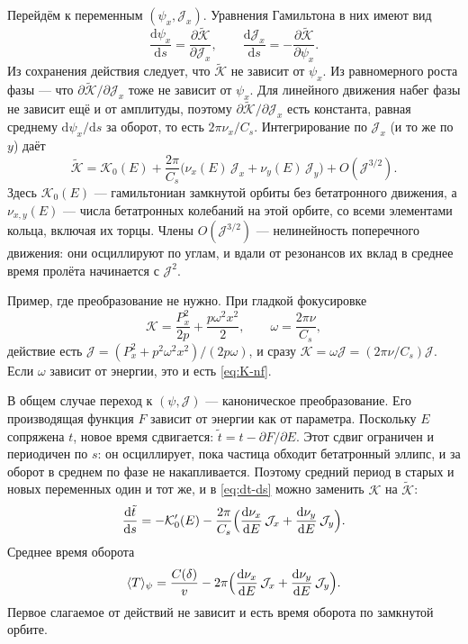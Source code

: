 Перейдём к переменным $(\psi_x,\mathcal{J}_x)$. Уравнения Гамильтона в них имеют вид
\begin{equation*}
\frac{\mathrm{d}\psi_x}{\mathrm{d}s}=\frac{\partial\tilde{\mathcal{K}}}{\partial\mathcal{J}_x},
\qquad
\frac{\mathrm{d}\mathcal{J}_x}{\mathrm{d}s}=-\frac{\partial\tilde{\mathcal{K}}}{\partial\psi_x}.
\end{equation*}
Из сохранения действия следует, что $\tilde{\mathcal{K}}$ не зависит от $\psi_x$. Из равномерного роста фазы --- что $\partial\tilde{\mathcal{K}}/\partial\mathcal{J}_x$ тоже не зависит от $\psi_x$. Для линейного движения набег фазы не зависит ещё и от амплитуды, поэтому $\partial\tilde{\mathcal{K}}/\partial\mathcal{J}_x$ есть константа, равная среднему $\mathrm{d}\psi_x/\mathrm{d}s$ за оборот, то есть $2\pi\nu_x/C_s$. Интегрирование по $\mathcal{J}_x$ (и то же по $y$) даёт
\begin{equation}
\label{eq:K-nf}
\tilde{\mathcal{K}}=\mathcal{K}_0(E)+\frac{2\pi}{C_s}\bigl(\nu_x(E)\,\mathcal{J}_x+\nu_y(E)\,\mathcal{J}_y\bigr)+O(\mathcal{J}^{3/2}).
\end{equation}
Здесь $\mathcal{K}_0(E)$ --- гамильтониан замкнутой орбиты без бетатронного движения, а $\nu_{x,y}(E)$ --- числа бетатронных колебаний на этой орбите, со всеми элементами кольца, включая их торцы. Члены $O(\mathcal{J}^{3/2})$ --- нелинейность поперечного движения: они осциллируют по углам, и вдали от резонансов их вклад в среднее время пролёта начинается с $\mathcal{J}^2$.

Пример, где преобразование не нужно. При гладкой фокусировке
\begin{equation*}
\mathcal{K}=\frac{P_x^2}{2p}+\frac{p\omega^2 x^2}{2},
\qquad
\omega=\frac{2\pi\nu}{C_s},
\end{equation*}
действие есть $\mathcal{J}=(P_x^2+p^2\omega^2 x^2)/(2p\omega)$, и сразу $\mathcal{K}=\omega\mathcal{J}=(2\pi\nu/C_s)\mathcal{J}$. Если $\omega$ зависит от энергии, это и есть \eqref{eq:K-nf}.

В общем случае переход к $(\psi,\mathcal{J})$ --- каноническое преобразование. Его производящая функция $F$ зависит от энергии как от параметра. Поскольку $E$ сопряжена $t$, новое время сдвигается: $\tilde t=t-\partial F/\partial E$. Этот сдвиг ограничен и периодичен по $s$: он осциллирует, пока частица обходит бетатронный эллипс, и за оборот в среднем по фазе не накапливается. Поэтому средний период в старых и новых переменных один и тот же, и в \eqref{eq:dt-ds} можно заменить $\mathcal{K}$ на $\tilde{\mathcal{K}}$:
\begin{equation}
\label{eq:dt-nf}
\frac{\mathrm{d}\tilde t}{\mathrm{d}s}
=-\mathcal{K}_0'(E)
-\frac{2\pi}{C_s}\Bigl(\frac{\mathrm{d}\nu_x}{\mathrm{d}E}\,\mathcal{J}_x+\frac{\mathrm{d}\nu_y}{\mathrm{d}E}\,\mathcal{J}_y\Bigr).
\end{equation}
Среднее время оборота
\begin{equation*}
\langle T\rangle_\psi
=\frac{C(\delta)}{v}
-2\pi\Bigl(\frac{\mathrm{d}\nu_x}{\mathrm{d}E}\,\mathcal{J}_x+\frac{\mathrm{d}\nu_y}{\mathrm{d}E}\,\mathcal{J}_y\Bigr).
\end{equation*}
Первое слагаемое от действий не зависит и есть время оборота по замкнутой орбите.

